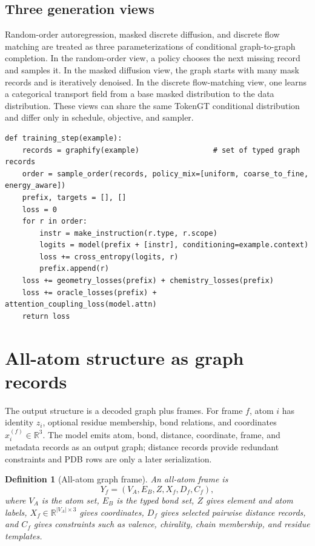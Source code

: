 \documentclass[11pt]{article}
\newtheorem{definition}{Definition}[section]
\newcommand{\R}{\mathbb{R}}
\newcommand{\1}{\mathbf{1}}
\begin{document}
\subsection{Three generation views}

Random-order autoregression, masked discrete diffusion, and discrete flow matching are treated as three parameterizations of conditional graph-to-graph completion. In the random-order view, a policy chooses the next missing record and samples it. In the masked diffusion view, the graph starts with many mask records and is iteratively denoised. In the discrete flow-matching view, one learns a categorical transport field from a base masked distribution to the data distribution. These views can share the same TokenGT conditional distribution and differ only in schedule, objective, and sampler.

\begin{lstlisting}[caption={Random-order graph training step.}]
def training_step(example):
    records = graphify(example)                 # set of typed graph records
    order = sample_order(records, policy_mix=[uniform, coarse_to_fine, energy_aware])
    prefix, targets = [], []
    loss = 0
    for r in order:
        instr = make_instruction(r.type, r.scope)
        logits = model(prefix + [instr], conditioning=example.context)
        loss += cross_entropy(logits, r)
        prefix.append(r)
    loss += geometry_losses(prefix) + chemistry_losses(prefix)
    loss += oracle_losses(prefix) + attention_coupling_loss(model.attn)
    return loss
\end{lstlisting}

\section{All-atom structure as graph records}

The output structure is a decoded graph plus frames. For frame $f$, atom $i$ has identity $z_i$, optional residue membership, bond relations, and coordinates $x_i^{(f)}\in\R^3$. The model emits atom, bond, distance, coordinate, frame, and metadata records as an output graph; distance records provide redundant constraints and PDB rows are only a later serialization.

\begin{definition}[All-atom graph frame]
An all-atom frame is
\[
  Y_f=(V_A,E_B,Z,X_f,D_f,C_f),
\]
where $V_A$ is the atom set, $E_B$ is the typed bond set, $Z$ gives element and atom labels, $X_f\in\R^{|V_A|\times 3}$ gives coordinates, $D_f$ gives selected pairwise distance records, and $C_f$ gives constraints such as valence, chirality, chain membership, and residue templates.
\end{definition}
\end{document}

